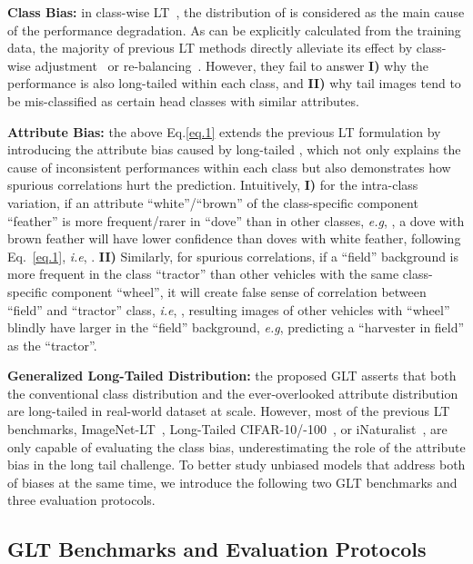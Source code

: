 \documentclass{article}
\def\eg{\emph{e.g}} \def\Eg{\emph{E.g}}
\def\ie{\emph{i.e}} \def\Ie{\emph{I.e}}
\begin{document}
\noindent\textbf{Class Bias:} in class-wise LT~\cite{zhang2021deep},  the distribution of  is considered as the main cause of the performance degradation. As  can be explicitly calculated from the training data, the majority of previous LT methods directly alleviate its effect by class-wise adjustment~\cite{ren2020balanced,menon2020long} or re-balancing~\cite{kang2019decoupling,zhou2019bbn}. However, they fail to answer 
\textbf{I)} why the performance is also long-tailed within each class, and 
\textbf{II)} why tail images tend to be mis-classified as certain head classes with similar attributes. 


\noindent\textbf{Attribute Bias:} the above Eq.\eqref{eq.1} extends the previous LT formulation by introducing the attribute bias caused by long-tailed , which not only explains the cause of inconsistent performances within each class but also demonstrates how spurious correlations hurt the prediction. Intuitively, 
\textbf{I)} for the intra-class variation, if an attribute ``white''/``brown'' of the class-specific component ``feather'' is more frequent/rarer in ``dove'' than in other classes, \eg, , a dove with brown feather will have lower confidence than doves with white feather, following Eq.~\eqref{eq.1}, \ie,  . 
\textbf{II)} Similarly, for spurious correlations, if a ``field'' background is more frequent in the class ``tractor'' than other vehicles with the same class-specific component ``wheel'', it will create false sense of correlation between ``field'' and ``tractor'' class, \ie, , resulting images of other vehicles with ``wheel'' blindly have larger  in the ``field'' background, \eg, predicting a ``harvester in field'' as the ``tractor''. 


\noindent\textbf{Generalized Long-Tailed Distribution: } the proposed GLT asserts that both the conventional class distribution and the ever-overlooked attribute distribution are long-tailed in real-world dataset at scale. However, most of the previous LT benchmarks, ImageNet-LT~\cite{liu2019large}, Long-Tailed CIFAR-10/-100~\cite{zhou2019bbn}, or iNaturalist~\cite{van2018inaturalist}, are only capable of evaluating the class bias, underestimating the role of the attribute bias in the long tail challenge. To better study unbiased models that address both of biases at the same time, we introduce the following two GLT benchmarks and three evaluation protocols.







\subsection{GLT Benchmarks and Evaluation Protocols} 
\end{document}
